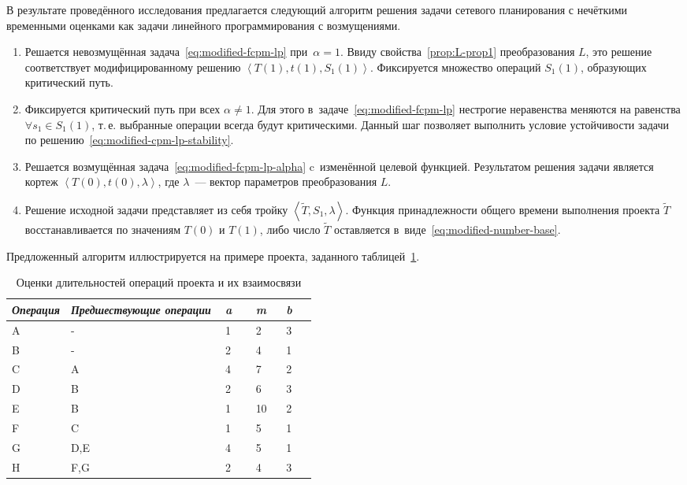 В результате проведённого исследования предлагается следующий алгоритм решения задачи сетевого планирования с нечёткими временными оценками как задачи линейного программирования с возмущениями.
\begin{enumerate}
  \item Решается невозмущённая задача~\eqref{eq:modified-fcpm-lp} при~$\alpha=1$. Ввиду свойства~\ref{prop:L-prop1} преобразования $L$, это решение соответствует модифицированному решению $\left \langle T\left(1\right), t\left(1\right), S_1\left(1\right) \right \rangle$. Фиксируется множество операций $S_1\left(1\right)$, образующих критический путь.
  \item Фиксируется критический путь при всех $\alpha \neq 1$. Для этого в~задаче~\eqref{eq:modified-fcpm-lp} нестрогие неравенства меняются на равенства $\forall s_1 \in S_1\left(1\right)$, т.\,е. выбранные операции всегда будут критическими. Данный шаг позволяет выполнить условие устойчивости задачи по решению~\eqref{eq:modified-cpm-lp-stability}.
  \item Решается возмущённая задача~\eqref{eq:modified-fcpm-lp-alpha} c~изменённой целевой функцией. Результатом решения задачи является кортеж $\left \langle T\left(0\right), t\left(0\right), \lambda \right \rangle$, где $\lambda$~--- вектор параметров преобразования $L$.
  \item Решение исходной задачи представляет из себя тройку $\left \langle \tilde T, S_1, \lambda \right \rangle$. Функция принадлежности общего времени выполнения проекта $\tilde T$ восстанавливается по значениям $T\left(0\right)$ и $T\left(1\right)$, либо число $\tilde T$ оставляется в~виде~\eqref{eq:modified-number-base}.
\end{enumerate}

Предложенный алгоритм иллюстрируется на примере проекта, заданного таблицей~\ref{t:sample-project-estimates}.
\begin{table}[h!]
\caption{Оценки длительностей операций проекта и их взаимосвязи}
\label{t:sample-project-estimates}
\begin{center}
\begin{tabularx}{0.9\textwidth}{|p{0.15\linewidth}|X|p{0.1\linewidth}|p{0.1\linewidth}|p{0.1\linewidth}|}
	\hline
		\centering \textit{Операция} & \centering \textit{Предшествующие операции} & \centering \textit{a} & \centering \textit{m} & \centering \textit{b} \tabularnewline	\hline
	\hline
		A & -   & 1 & 2  & 3 \tabularnewline \hline
		B & -   & 2 & 4  & 1 \tabularnewline \hline
		C & A   & 4 & 7  & 2 \tabularnewline \hline
		D & B   & 2 & 6  & 3 \tabularnewline \hline
		E & B   & 1 & 10 & 2 \tabularnewline \hline
		F & C   & 1 & 5  & 1 \tabularnewline \hline
		G & D,E & 4 & 5  & 1 \tabularnewline \hline
		H & F,G & 2 & 4  & 3 \tabularnewline
    \hline
\end{tabularx}
\end{center}
\end{table}

